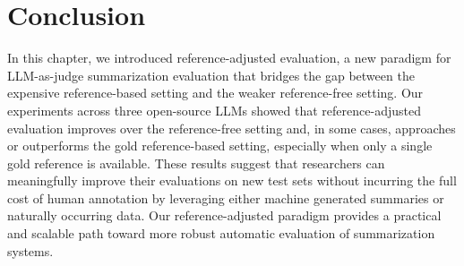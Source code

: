 \section{Conclusion}


In this chapter, we introduced reference-adjusted evaluation, a new paradigm for LLM-as-judge summarization evaluation that bridges the gap between the expensive reference-based setting and the weaker reference-free setting. Our experiments across three open-source LLMs showed that reference-adjusted evaluation improves over the reference-free setting and, in some cases, approaches or outperforms the gold reference-based setting, especially when only a single gold reference is available. These results suggest that researchers can meaningfully improve their evaluations on new test sets without incurring the full cost of human annotation by leveraging either machine generated summaries or naturally occurring data. Our reference-adjusted paradigm provides a practical and scalable path toward more robust automatic evaluation of summarization systems.